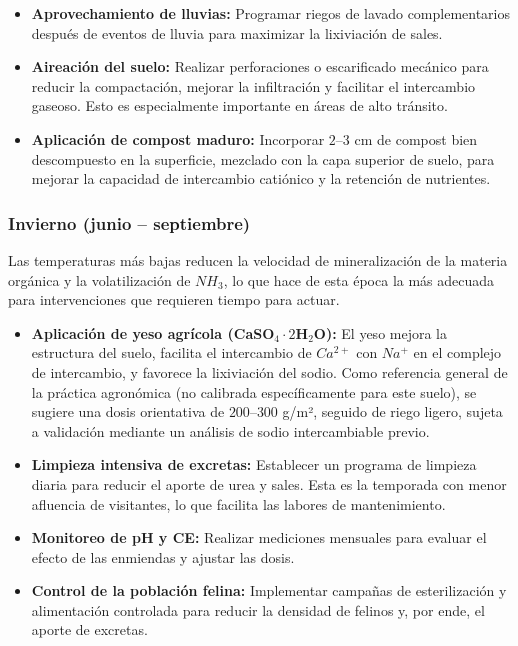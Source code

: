 \documentclass[fleqn]{jaes}
\begin{document}
\begin{itemize}
  \item \textbf{Aprovechamiento de lluvias:} Programar riegos de lavado complementarios después de eventos de lluvia para maximizar la lixiviación de sales.
  \item \textbf{Aireación del suelo:} Realizar perforaciones o escarificado mecánico para reducir la compactación, mejorar la infiltración y facilitar el intercambio gaseoso. Esto es especialmente importante en áreas de alto tránsito.
  \item \textbf{Aplicación de compost maduro:} Incorporar $2$--$3$ cm de compost bien descompuesto en la superficie, mezclado con la capa superior de suelo, para mejorar la capacidad de intercambio catiónico y la retención de nutrientes.
\end{itemize}

\subsubsection{Invierno (junio -- septiembre)}

Las temperaturas más bajas reducen la velocidad de mineralización de la materia orgánica y la volatilización de $NH_3$, lo que hace de esta época la más adecuada para intervenciones que requieren tiempo para actuar.

\begin{itemize}
  \item \textbf{Aplicación de yeso agrícola (CaSO$_4\cdot 2$H$_2$O):} El yeso mejora la estructura del suelo, facilita el intercambio de $Ca^{2+}$ con $Na^+$ en el complejo de intercambio, y favorece la lixiviación del sodio. Como referencia general de la práctica agronómica (no calibrada específicamente para este suelo), se sugiere una dosis orientativa de $200$--$300$ g/m², seguido de riego ligero, sujeta a validación mediante un análisis de sodio intercambiable previo.
  \item \textbf{Limpieza intensiva de excretas:} Establecer un programa de limpieza diaria para reducir el aporte de urea y sales. Esta es la temporada con menor afluencia de visitantes, lo que facilita las labores de mantenimiento.
  \item \textbf{Monitoreo de pH y CE:} Realizar mediciones mensuales para evaluar el efecto de las enmiendas y ajustar las dosis.
  \item \textbf{Control de la población felina:} Implementar campañas de esterilización y alimentación controlada para reducir la densidad de felinos y, por ende, el aporte de excretas.
\end{itemize}
\end{document}
